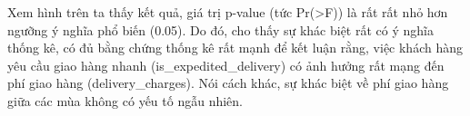     Xem hình trên ta thấy kết quả, giá trị p-value (tức Pr(>F)) là rất rất nhỏ hơn ngưỡng ý nghĩa phổ biến (0.05). Do đó, cho thấy sự
khác biệt rất có ý nghĩa thống kê, có đủ bằng chứng thống kê rất mạnh để kết luận rằng, việc khách hàng yêu cầu giao hàng nhanh (is\_expedited\_delivery) có ảnh hưởng rất mạng đến phí giao hàng (delivery\_charges). Nói cách khác, sự khác biệt về phí giao hàng giữa các mùa không có yếu tố ngẫu nhiên.

